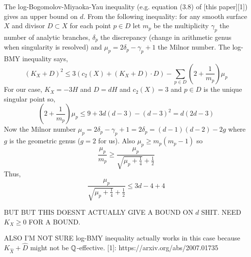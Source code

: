 \documentclass[12pt]{article}
\begin{document}
The log-Bogomolov-Miyaoka-Yau inequality (e.g. equation (3.8) of [this paper][1]) gives an upper bound on $d$. From the following inequality: for any smooth surface $X$ and divisor $D \subset X$ for each point $p \in D$ let $m_p$ be the multiplicity $\gamma_p$ the number of analytic branches, $\delta_p$ the discrepancy (change in arithmetic genus when singularity is resolved) and $\mu_p = 2 \delta_p - \gamma_p + 1$ the Milnor number. The log-BMY inequality says,
$$ (K_X + D)^2 \le 3 (c_2(X) + (K_X + D) \cdot D) - \sum_{p \in D} \left(2 + \frac{1}{m_p} \right) \mu_p $$
For our case, $K_X = -3 H$ and $D = d H$ and $c_2(X) = 3$ and $p \in D$ is the unique singular point so, 
$$ \left( 2 + \frac{1}{m_p} \right) \mu_p \le 9 + 3 d (d-3) - (d-3)^2 = d(2d - 3) $$
Now the Milnor number $\mu_p = 2 \delta_p - \gamma_p + 1 = 2 \delta_p = (d-1)(d-2) - 2g$ where $g$ is the geometric genus ($g = 2$ for us). Also $\mu_p \ge m_p(m_p - 1)$ so 
$$ \frac{\mu_p}{m_p} \ge \frac{\mu_p}{\sqrt{\mu_p + \frac{1}{4}} + \frac{1}{2}} $$
Thus,
$$\frac{\mu_p}{\sqrt{\mu_p + \frac{1}{4}} + \frac{1}{2}} \le 3 d - 4 + 4 $$

BUT BUT THIS DOESNT ACTUALLY GIVE A BOUND ON $d$ SHIT. NEED $K_X \ge 0$ FOR A BOUND.


ALSO I'M NOT SURE log-BMY inequality actually works in this case because $K_{\hat{X}} + \hat{D}$ might not be $\mathbb{Q}$-effective.
  [1]: https://arxiv.org/abs/2007.01735
\end{document}
